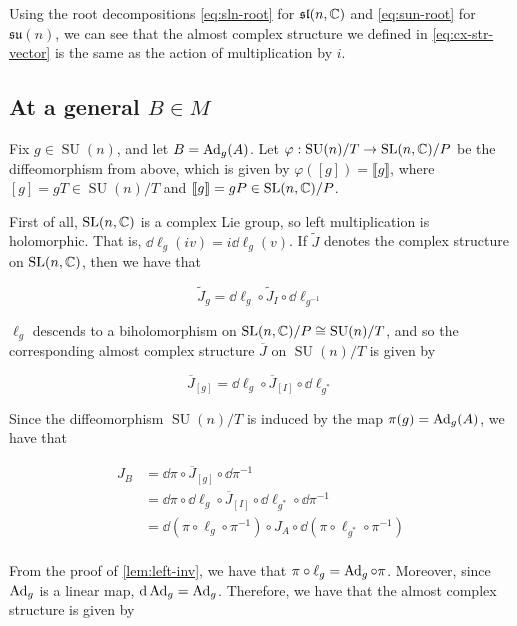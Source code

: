 \documentclass{article}
\DeclareMathOperator{\SU}{SU}
\newcommand{\su}{\mathfrak{su}}
\renewcommand{\sl}{\mathfrak{sl}}
\renewcommand{\tilde}{\widetilde}
\begin{document}
Using the root decompositions \cref{eq:sln-root} for \(\sl(n, \C)\) and \cref{eq:sun-root} for \(\su(n)\), we can see that the almost complex structure we defined in \cref{eq:cx-str-vector} is the same as the action of multiplication by \(i\).

\subsection{At a general \(B \in M\)}

Fix \(g \in \SU(n)\), and let \(B = \operatorname{Ad}_g(A)\). Let \(\varphi : \SU(n)/T \to \SL(n, \C)/P\) be the diffeomorphism from above, which is given by \(\varphi([g]) = \llbracket g\rrbracket\), where \([g] = gT \in \SU(n)/T\) and \(\llbracket g \rrbracket = gP \in \operatorname{SL}(n, \mathbb{C})/P\).

First of all, \(\operatorname{SL}(n, \mathbb{C})\) is a complex Lie group, so left multiplication is holomorphic. That is, \(\dd \ell_g(iv) = i\dd\ell_g(v)\). If \(\tilde J\) denotes the complex structure on \(\operatorname{SL}(n, \mathbb{C})\), then we have that

\[\tilde J_g = \dd \ell_g \circ \tilde J_I \circ \dd\ell_{g^{-1}}\]

\(\ell_g\) descends to a biholomorphism on \(\SL(n, \C)/P \cong \SU(n)/T\), and so the corresponding almost complex structure \(\overline J\) on \(\SU(n)/T\) is given by

\begin{equation}
    \label{eq:cx-str-quot}
    \overline J_{[g]} = \dd\ell_g \circ \overline J_{[I]} \circ \dd\ell_{g^*}
\end{equation}

Since the diffeomorphism \(\SU(n)/T\) is induced by the map \(\pi(g) = \operatorname{Ad}_g(A)\), we have that

\begin{align*}
    J_B &= \dd\pi \circ \overline J_{[g]} \circ \dd\pi^{-1} \\
    &= \dd\pi \circ \dd \ell_g \circ \overline J_{[I]} \circ \dd \ell_{g^*} \circ \dd \pi^{-1} \\
    &= \dd(\pi \circ \ell_g \circ \pi^{-1}) \circ J_A \circ \dd(\pi \circ \ell_{g^*} \circ \pi^{-1}) \\
\end{align*}

From the proof of \cref{lem:left-inv}, we have that \(\pi \circ \ell_g = \operatorname{Ad}_g \circ \pi\). Moreover, since \(\operatorname{Ad}_g\) is a linear map, \(\dd \operatorname{Ad}_g = \operatorname{Ad}_g\). Therefore, we have that the almost complex structure is given by
\end{document}
